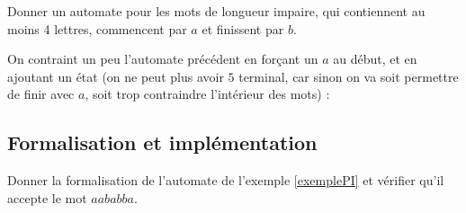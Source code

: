 \begin{exercice}
Donner un automate pour les mots de longueur impaire, qui contiennent au moins 4 lettres, commencent par $a$ et finissent par $b$.
\end{exercice}


\begin{correction*}

On contraint un peu l'automate précédent en forçant un $a$ au début, et en ajoutant un état (on ne peut plus avoir $5$ terminal, car sinon on va soit permettre de finir avec $a$, soit trop contraindre l'intérieur des mots) :

\centering
{}
\end{correction*}

\subsection{Formalisation et implémentation}

\begin{exercice}
Donner la formalisation de l'automate de l'exemple \ref{exemplePI} et vérifier qu'il accepte le mot $aababba$. 
\end{exercice}

